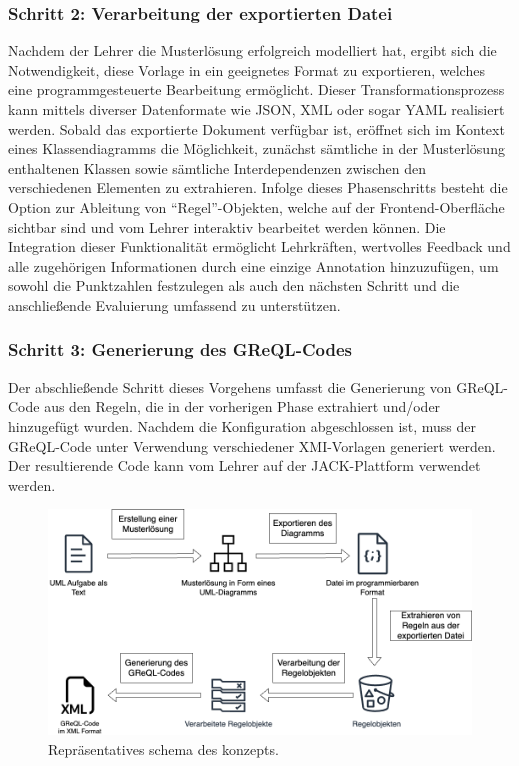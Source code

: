 \subsubsection{Schritt 2: Verarbeitung der exportierten Datei}

Nachdem der Lehrer die Musterlösung erfolgreich modelliert hat, ergibt sich die Notwendigkeit, diese Vorlage in ein geeignetes Format zu exportieren, welches eine programmgesteuerte Bearbeitung ermöglicht. Dieser Transformationsprozess kann mittels diverser Datenformate wie JSON, XML oder sogar YAML realisiert werden. Sobald das exportierte Dokument verfügbar ist, eröffnet sich im Kontext eines Klassendiagramms die Möglichkeit, zunächst sämtliche in der Musterlösung enthaltenen Klassen sowie sämtliche Interdependenzen zwischen den verschiedenen Elementen zu extrahieren. Infolge dieses Phasenschritts besteht die Option zur Ableitung von ``Regel''-Objekten, welche auf der Frontend-Oberfläche sichtbar sind und vom Lehrer interaktiv bearbeitet werden können. Die Integration dieser Funktionalität ermöglicht Lehrkräften, wertvolles Feedback und alle zugehörigen Informationen durch eine einzige Annotation hinzuzufügen, um sowohl die Punktzahlen festzulegen als auch den nächsten Schritt und die anschließende Evaluierung umfassend zu unterstützen.

\subsubsection{Schritt 3: Generierung des GReQL-Codes}

Der abschließende Schritt dieses Vorgehens umfasst die Generierung von GReQL-Code aus den Regeln, die in der vorherigen Phase extrahiert und/oder hinzugefügt wurden. Nachdem die Konfiguration abgeschlossen ist, muss der GReQL-Code unter Verwendung verschiedener XMI-Vorlagen generiert werden. Der resultierende Code kann vom Lehrer auf der JACK-Plattform verwendet werden.

\begin{figure}
	\centering
	\includegraphics[width=15cm]{images/concept.png}
	\caption{Repräsentatives schema des konzepts.}
	\label{fig:concept}
\end{figure}

